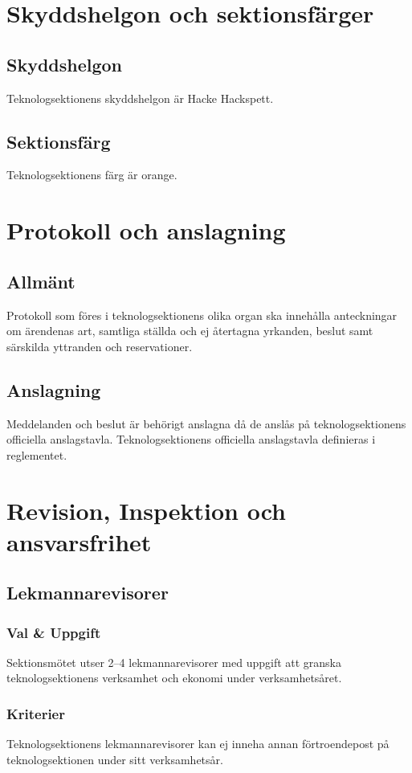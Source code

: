 \documentclass[a4paper]{dtek}
\begin{document}
\section{Skyddshelgon och sektionsfärger}
\subsection{Skyddshelgon}
Teknologsektionens skyddshelgon är Hacke Hackspett.
\subsection{Sektionsfärg}
Teknologsektionens färg är orange.
\newpage

\section{Protokoll och anslagning}
\subsection{Allmänt}
Protokoll som föres i teknologsektionens olika organ ska innehålla anteckningar om ärendenas art, samtliga ställda och ej återtagna yrkanden, beslut samt särskilda yttranden och reservationer.
\subsection{Anslagning}
Meddelanden och beslut är behörigt anslagna då de anslås på teknologsektionens officiella anslagstavla.
Teknologsektionens officiella anslagstavla definieras i reglementet.
\newpage

\section{Revision, Inspektion och ansvarsfrihet}
\subsection{Lekmannarevisorer}
\subsubsection{Val \& Uppgift}
Sektionsmötet utser 2–4 lekmannarevisorer med uppgift att granska teknologsektionens verksamhet och ekonomi under verksamhetsåret.
\subsubsection{Kriterier}
Teknologsektionens lekmannarevisorer kan ej inneha annan förtroendepost på teknologsektionen under sitt verksamhetsår.
\end{document}
